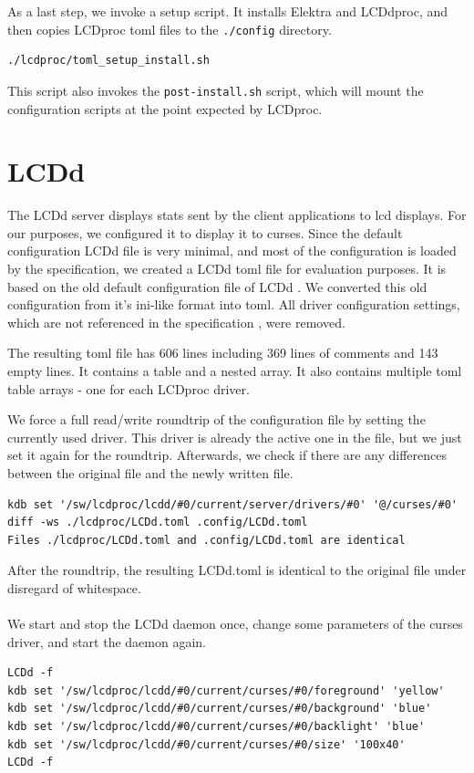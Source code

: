 \documentclass[draft,final]{vutinfth} %
\begin{document}
As a last step, we invoke a setup script. It installs Elektra and LCDdproc, and then copies LCDproc \acrshort{toml} files to the \texttt{./config} directory.
\begin{Verbatim}[frame=single]
./lcdproc/toml_setup_install.sh
\end{Verbatim}
This script also invokes the \texttt{post-install.sh} script, which will mount the configuration scripts at the point expected by LCDproc.

\section{LCDd}
The LCDd server displays stats sent by the client applications to \acrshort{lcd} displays.
For our purposes, we configured it to display it to curses.
Since the default configuration LCDd file is very minimal, and most of the configuration is loaded by the specification, we created a LCDd \acrshort{toml} file for evaluation purposes.
It is based on the old default configuration file of LCDd \cite{LCDprocconf}.
We converted this old configuration from it's ini-like format into \acrshort{toml}.
All driver configuration settings, which are not referenced in the specification \cite{bauhausforklcdprocslcddspec}, were removed.

The resulting \acrshort{toml} file has 606 lines including 369 lines of comments and 143 empty lines.
It contains a table and a nested array.
It also contains multiple \acrshort{toml} table arrays - one for each LCDproc driver.

We force a full read/write roundtrip of the configuration file by setting the currently used driver. This driver is already the active one in the file, but we just set it again for the roundtrip.
Afterwards, we check if there are any differences between the original file and the newly written file.

\begin{Verbatim}[frame=single, fontsize=\small]
kdb set '/sw/lcdproc/lcdd/#0/current/server/drivers/#0' '@/curses/#0'
diff -ws ./lcdproc/LCDd.toml .config/LCDd.toml
Files ./lcdproc/LCDd.toml and .config/LCDd.toml are identical
\end{Verbatim}

After the roundtrip, the resulting LCDd.toml is identical to the original file under disregard of whitespace.
\\\\
We start and stop the LCDd daemon once, change some parameters of the curses driver, and start the daemon again.
\begin{Verbatim}[frame=single, fontsize=\small]
LCDd -f
kdb set '/sw/lcdproc/lcdd/#0/current/curses/#0/foreground' 'yellow'
kdb set '/sw/lcdproc/lcdd/#0/current/curses/#0/background' 'blue'
kdb set '/sw/lcdproc/lcdd/#0/current/curses/#0/backlight' 'blue'
kdb set '/sw/lcdproc/lcdd/#0/current/curses/#0/size' '100x40'
LCDd -f
\end{Verbatim}
\end{document}
